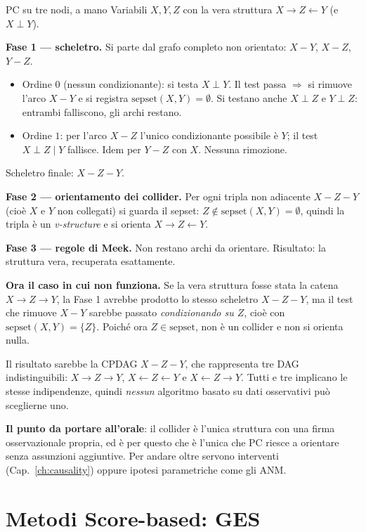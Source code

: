\begin{esempiosvolto}{PC su tre nodi, a mano}
Variabili $X, Y, Z$ con la vera struttura $X \to Z \leftarrow Y$ (e $X \perp Y$).

\textbf{Fase 1 — scheletro.} Si parte dal grafo completo non orientato: $X-Y$, $X-Z$, $Y-Z$.
\begin{itemize}[leftmargin=1.4em]
  \item Ordine $0$ (nessun condizionante): si testa $X \perp Y$. Il test passa $\Rightarrow$ si rimuove l'arco $X-Y$ e si registra $\text{sepset}(X,Y) = \emptyset$. Si testano anche $X \perp Z$ e $Y \perp Z$: entrambi falliscono, gli archi restano.
  \item Ordine $1$: per l'arco $X-Z$ l'unico condizionante possibile è $Y$; il test $X \perp Z \mid Y$ fallisce. Idem per $Y-Z$ con $X$. Nessuna rimozione.
\end{itemize}
Scheletro finale: $X - Z - Y$.

\textbf{Fase 2 — orientamento dei collider.} Per ogni tripla non adiacente $X - Z - Y$ (cioè $X$ e $Y$ non collegati) si guarda il sepset: $Z \notin \text{sepset}(X,Y) = \emptyset$, quindi la tripla è un \emph{v-structure} e si orienta $X \to Z \leftarrow Y$.

\textbf{Fase 3 — regole di Meek.} Non restano archi da orientare. Risultato: la struttura vera, recuperata esattamente.

\medskip
\textbf{Ora il caso in cui non funziona.} Se la vera struttura fosse stata la catena $X \to Z \to Y$, la Fase 1 avrebbe prodotto lo stesso scheletro $X - Z - Y$, ma il test che rimuove $X-Y$ sarebbe passato \emph{condizionando su $Z$}, cioè con $\text{sepset}(X,Y) = \{Z\}$. Poiché ora $Z \in \text{sepset}$, non è un collider e non si orienta nulla.

Il risultato sarebbe la CPDAG $X - Z - Y$, che rappresenta tre DAG indistinguibili: $X \to Z \to Y$, $X \leftarrow Z \leftarrow Y$ e $X \leftarrow Z \to Y$. Tutti e tre implicano le stesse indipendenze, quindi \emph{nessun} algoritmo basato su dati osservativi può sceglierne uno.

\textbf{Il punto da portare all'orale}: il collider è l'unica struttura con una firma osservazionale propria, ed è per questo che è l'unica che PC riesce a orientare senza assunzioni aggiuntive. Per andare oltre servono interventi (Cap.~\ref{ch:causality}) oppure ipotesi parametriche come gli ANM.
\end{esempiosvolto}

\section{Metodi Score-based: GES}

